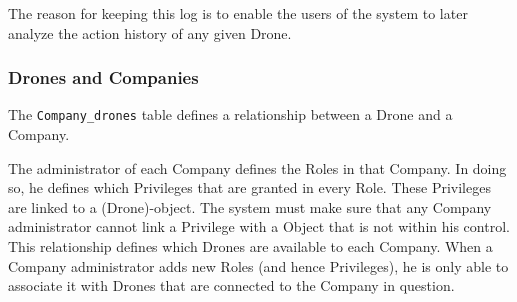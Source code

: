 The reason for keeping this log is to enable the users of the system to later analyze the action history of any given Drone.


\subsubsection*{Drones and Companies}
The \verb+Company_drones+ table defines a relationship between a Drone and a Company.

The administrator of each Company defines the Roles in that Company.
In doing so, he defines which Privileges that are granted in every Role.
These Privileges are linked to a (Drone)-object.
The system must make sure that any Company administrator cannot link a Privilege with a Object that is not within his control. \\

This relationship defines which Drones are available to each Company.
When a Company administrator adds new Roles (and hence Privileges), he is only able to associate it with Drones that are connected to the Company in question.
